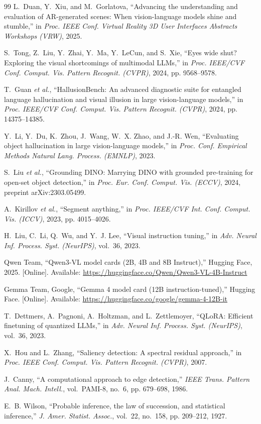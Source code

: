 \documentclass[journal,onecolumn]{IEEEtran}
\begin{document}
\begin{thebibliography}{99}
L.~Duan, Y.~Xiu, and M.~Gorlatova, ``Advancing the understanding and evaluation of {AR}-generated
scenes: When vision-language models shine and stumble,'' in \emph{Proc. IEEE Conf. Virtual Reality 3D
User Interfaces Abstracts Workshops (VRW)}, 2025.

S.~Tong, Z.~Liu, Y.~Zhai, Y.~Ma, Y.~LeCun, and S.~Xie, ``Eyes wide shut? {E}xploring the visual
shortcomings of multimodal {LLMs},'' in \emph{Proc. IEEE/CVF Conf. Comput. Vis. Pattern Recognit.
(CVPR)}, 2024, pp. 9568--9578.

T.~Guan \emph{et al.}, ``{HallusionBench}: An advanced diagnostic suite for entangled language
hallucination and visual illusion in large vision-language models,'' in \emph{Proc. IEEE/CVF Conf.
Comput. Vis. Pattern Recognit. (CVPR)}, 2024, pp. 14375--14385.

Y.~Li, Y.~Du, K.~Zhou, J.~Wang, W.~X. Zhao, and J.-R. Wen, ``Evaluating object hallucination in large
vision-language models,'' in \emph{Proc. Conf. Empirical Methods Natural Lang. Process. (EMNLP)}, 2023.

S.~Liu \emph{et al.}, ``Grounding {DINO}: Marrying {DINO} with grounded pre-training for open-set
object detection,'' in \emph{Proc. Eur. Conf. Comput. Vis. (ECCV)}, 2024, preprint arXiv:2303.05499.

A.~Kirillov \emph{et al.}, ``Segment anything,'' in \emph{Proc. IEEE/CVF Int. Conf. Comput. Vis.
(ICCV)}, 2023, pp. 4015--4026.

H.~Liu, C.~Li, Q.~Wu, and Y.~J. Lee, ``Visual instruction tuning,'' in \emph{Adv. Neural Inf.
Process. Syst. (NeurIPS)}, vol.~36, 2023.

Qwen Team, ``{Qwen3-VL} model cards (2B, 4B and 8B Instruct),'' Hugging Face, 2025. [Online].
Available: \url{https://huggingface.co/Qwen/Qwen3-VL-4B-Instruct}

Gemma Team, Google, ``{Gemma 4} model card (12B instruction-tuned),'' Hugging Face. [Online].
Available: \url{https://huggingface.co/google/gemma-4-12B-it}

T.~Dettmers, A.~Pagnoni, A.~Holtzman, and L.~Zettlemoyer, ``{QLoRA}: Efficient finetuning of
quantized {LLMs},'' in \emph{Adv. Neural Inf. Process. Syst. (NeurIPS)}, vol.~36, 2023.

X.~Hou and L.~Zhang, ``Saliency detection: A spectral residual approach,'' in \emph{Proc. IEEE Conf.
Comput. Vis. Pattern Recognit. (CVPR)}, 2007.

J.~Canny, ``A computational approach to edge detection,'' \emph{IEEE Trans. Pattern Anal. Mach.
Intell.}, vol.~PAMI-8, no.~6, pp. 679--698, 1986.

E.~B. Wilson, ``Probable inference, the law of succession, and statistical inference,'' \emph{J. Amer.
Statist. Assoc.}, vol.~22, no.~158, pp. 209--212, 1927.

\end{thebibliography}
\end{document}
